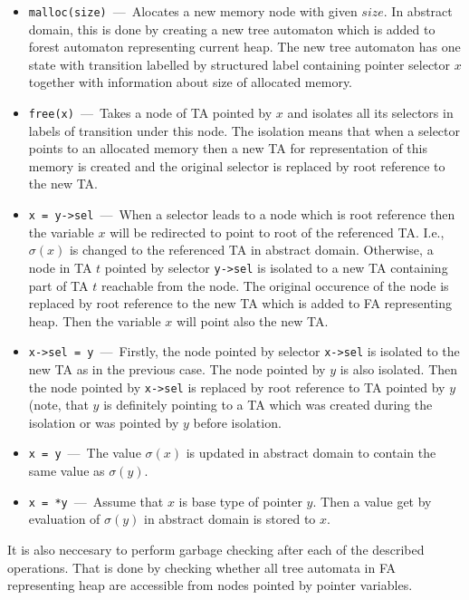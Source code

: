\documentclass[a4paper, 12pt]{article}
\begin{document}
\begin{itemize}
	\item \texttt{malloc(size)} \,---\, Alocates a new memory node with given $size$.
		In abstract domain, this is done by creating a new tree automaton which
		is added to forest automaton representing current heap.
		The new tree automaton has one state with transition labelled by
		structured label containing pointer selector $x$ together with information
		about size of allocated memory.
	\item \texttt{free(x)} \,---\, Takes a node of TA pointed by $x$ and isolates all
		its selectors in labels of transition under this node.
		The isolation means that when a selector points to an allocated memory
		then a new TA for representation of this memory is created and
		the original selector is replaced by root reference to the new TA.
	\item \texttt{x = y->sel} \,---\, When a selector leads to a node which is root
		reference then the variable $x$ will be redirected to point to
		root of the referenced TA.
		I.e., $\sigma(x)$ is changed to the referenced TA in abstract domain.
		Otherwise, a node in TA $t$ pointed by selector \texttt{y->sel} is isolated to a new TA
		containing part of TA $t$ reachable from the node.
		The original occurence of the node is replaced by root reference to the new TA which is
		added to FA representing heap.
		Then the variable $x$ will point also the new TA.
		
	\item \texttt{x->sel = y} \,---\, Firstly, the node pointed by selector \texttt{x->sel}
		is isolated to the new TA as in the previous case.
		The node pointed by $y$ is also isolated. 
		Then the node pointed by \texttt{x->sel} is replaced
		by root reference to TA pointed by $y$ (note, that
		$y$ is definitely pointing to a TA which was created
		during the isolation or was pointed by $y$ before isolation.
	
	\item \texttt{x = y} \,---\, The value $\sigma(x)$ is updated in abstract
		domain to contain the same value as $\sigma(y)$.

	\item \texttt{x = *y} \,---\, Assume that $x$ is base type of pointer $y$.
		Then a value get by evaluation of $\sigma(y)$ in abstract domain is
		stored to $x$.
	
\end{itemize}

It is also neccesary to perform garbage checking after each of the described operations.
That is done by checking whether all tree automata in FA representing heap are accessible
from nodes pointed by pointer variables.
\end{document}
